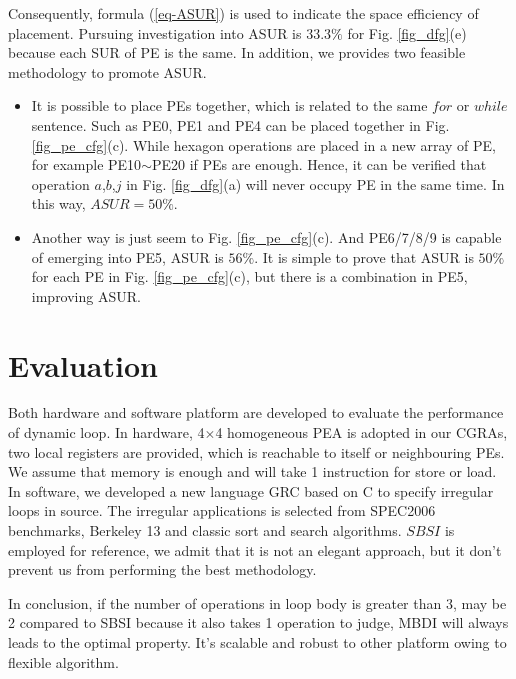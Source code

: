\documentclass[10pt, conference, compsocconf]{IEEEtran}
\begin{document}
Consequently, formula (\ref{eq-ASUR}) is used to indicate the space efficiency of placement. Pursuing investigation into ASUR is $33.3\%$ for Fig. \ref{fig_dfg}(e) because each SUR of PE is the same. In addition, we provides two feasible methodology to promote ASUR.
\begin{itemize}
	\item{It is possible to place PEs together, which is related to the same $for$ or $while$ sentence. Such as PE0, PE1 and PE4 can be placed together in Fig. \ref{fig_pe_cfg}(c). While hexagon operations are placed in a new array of PE, for example PE10$\sim$PE20 if PEs are enough. Hence, it can be verified that operation  $a$,$b$,$j$ in Fig. \ref{fig_dfg}(a) will never occupy PE in the same time. In this way, $ASUR = 50\%$.}
	\item{Another way is just seem to Fig. \ref{fig_pe_cfg}(c). And PE6/7/8/9 is capable of emerging into PE5, ASUR is $56\%$. It is simple to prove that ASUR is $50\%$ for each PE in Fig. \ref{fig_pe_cfg}(c), but there is a combination in PE5, improving ASUR.}
\end{itemize}
\section{Evaluation}
Both hardware and software platform are developed to evaluate the performance of dynamic loop. In hardware, 4$\times$4 homogeneous PEA is adopted in our CGRAs, two local registers are provided, which is reachable to itself or neighbouring PEs. We assume that memory is enough and will take 1 instruction for store or load. In software, we developed a new language GRC based on C to specify irregular loops in source. The irregular applications is selected from SPEC2006 benchmarks\cite{ev-henning2006spec}, Berkeley 13 \cite{ev-asanovic2006landscape} and classic sort and search algorithms. $SBSI$ is employed for reference, we admit that it is not an elegant approach, but it don't prevent us from performing the best methodology. 

In conclusion, if the number of operations in loop body is greater than 3, may be 2 compared to SBSI because it also takes 1 operation to judge, MBDI will always leads to the optimal property. It's scalable and robust to other platform owing to flexible algorithm.

\end{document}
